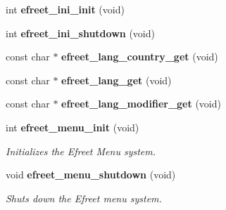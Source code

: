 \begin{CompactItemize}
int {\bf efreet\_\-ini\_\-init} (void)
\item 
int {\bf efreet\_\-ini\_\-shutdown} (void)
\item 
const char $\ast$ {\bf efreet\_\-lang\_\-country\_\-get} (void)
\item 
const char $\ast$ {\bf efreet\_\-lang\_\-get} (void)
\item 
const char $\ast$ {\bf efreet\_\-lang\_\-modifier\_\-get} (void)
\item 
int {\bf efreet\_\-menu\_\-init} (void)
\begin{CompactList}\small\item\em Initializes the Efreet Menu system. \item\end{CompactList}\item 
void {\bf efreet\_\-menu\_\-shutdown} (void)
\begin{CompactList}\small\item\em Shuts down the Efreet menu system. \item\end{CompactList}\end{CompactItemize}
